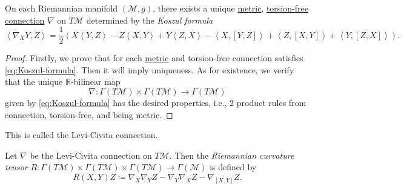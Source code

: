 \begin{proposition}\label{prop:Koszul-formula}
	On each Riemannian manifold \((\mathcal{M} , g)\), there exists a unique \hyperref[def:metric-connection]{metric}, \hyperref[def:torsion-free]{torsion-free} \hyperref[def:linear-connection]{connection} \(\nabla \) on \(T\mathcal{M} \) determined by the \emph{Koszul formula}
	\begin{equation}\label{eq:Koszul-formula}
		\left\langle \nabla _X Y, Z \right\rangle = \frac{1}{2} \left( X \left\langle Y, Z \right\rangle - Z\left\langle X, Y \right\rangle + Y\left\langle Z, X \right\rangle - \left\langle X, [Y, Z] \right\rangle + \left\langle Z, [X, Y] \right\rangle + \left\langle Y, [Z, X] \right\rangle \right).
	\end{equation}
\end{proposition}
\begin{proof}
	Firstly, we prove that for each \hyperref[def:metric-connection]{metric} and torsion-free connection satisfies \autoref{eq:Koszul-formula}. Then it will imply uniqueness. As for existence, we verify that the unique \(\mathbb{R} \)-bilinear map
	\[
		\nabla \colon \Gamma (T \mathcal{M} ) \times \Gamma (T \mathcal{M} )\to \Gamma (T\mathcal{M} )
	\]
	given by \autoref{eq:Koszul-formula} has the desired properties, i.e., \(2\) product rules from connection, torsion-free, and being metric.
\end{proof}

\begin{remark}
	This is called the Levi-Civita connection.
\end{remark}

\begin{definition}\label{def:Riemannian-curvature-tensor}
	Let \(\nabla \) be the Levi-Civita connection on \(T \mathcal{M} \). Then the \emph{Riemannian curvature tensor} \(R\colon \Gamma (T \mathcal{M} ) \times \Gamma (T \mathcal{M} )\times \Gamma (T \mathcal{M} ) \to \Gamma (\mathcal{M} )\) is defined by
	\[
		R(X, Y)Z \coloneqq \nabla _X \nabla _Y Z - \nabla _Y \nabla _X Z - \nabla _{[X, Y]}Z.
	\]
\end{definition}